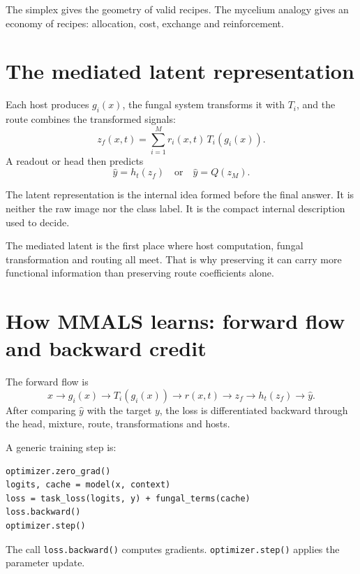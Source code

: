 \documentclass[11pt,a4paper]{article}
\newcommand{\codeword}[1]{\texttt{\textcolor{DeepTeal}{#1}}}
\begin{document}
\begin{keybox}
The simplex gives the geometry of valid recipes. The mycelium analogy gives an economy of recipes: allocation, cost, exchange and reinforcement.
\end{keybox}

\newpage
\section{The mediated latent representation}

Each host produces $g_i(x)$, the fungal system transforms it with $T_i$, and the route combines the transformed signals:
\[
z_f(x,t)=\sum_{i=1}^{M}r_i(x,t)\,T_i(g_i(x)).
\]
A readout or head then predicts
\[
\hat y=h_t(z_f) \quad\text{or}\quad \hat y=Q(z_M).
\]

\begin{twelvebox}
The latent representation is the internal idea formed before the final answer. It is neither the raw image nor the class label. It is the compact internal description used to decide.
\end{twelvebox}

\begin{engineerbox}
The mediated latent is the first place where host computation, fungal transformation and routing all meet. That is why preserving it can carry more functional information than preserving route coefficients alone.
\end{engineerbox}

\section{How MMALS learns: forward flow and backward credit}

The forward flow is
\[
x\rightarrow g_i(x)\rightarrow T_i(g_i(x))\rightarrow r(x,t)\rightarrow z_f\rightarrow h_t(z_f)\rightarrow\hat y.
\]
After comparing $\hat y$ with the target $y$, the loss is differentiated backward through the head, mixture, route, transformations and hosts.

\begin{engineerbox}
A generic training step is:
\begin{verbatim}
optimizer.zero_grad()
logits, cache = model(x, context)
loss = task_loss(logits, y) + fungal_terms(cache)
loss.backward()
optimizer.step()
\end{verbatim}
The call \codeword{loss.backward()} computes gradients. \codeword{optimizer.step()} applies the parameter update.
\end{engineerbox}
\end{document}
